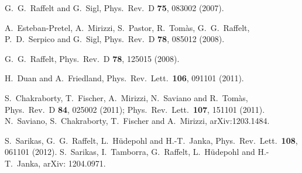 \documentclass[twocolumn,prd,showpacs,
floatfix,preprintnumbers,nofootinbib]{revtex4}
\begin{document}
\begin{thebibliography}{00}
  G.~G.~Raffelt and G.~Sigl,
  Phys.\ Rev.\  D {\bf 75}, 083002 (2007).

  A.~Esteban-Pretel, A.~Mirizzi, S.~Pastor, R.~Tom\`as,
  G.~G.~Raffelt, P.~D.~Serpico and G.~Sigl,
  Phys.\ Rev.\  D {\bf 78}, 085012 (2008).

  G.~G.~Raffelt,
  Phys.\ Rev.\ D {\bf 78}, 125015 (2008).

  H.~Duan and A.~Friedland,
  Phys.\ Rev.\ Lett.\  {\bf 106}, 091101 (2011).

  S.~Chakraborty, T.~Fischer, A.~Mirizzi, N.~Saviano and R.~Tom\`as,
  Phys.\ Rev.\  D {\bf 84}, 025002 (2011);
  Phys.\ Rev.\ Lett.\  {\bf 107}, 151101 (2011).
  N.~Saviano, S.~Chakraborty, T.~Fischer and A.~Mirizzi,
  arXiv:1203.1484.

  S.~Sarikas, G.~G.~Raffelt, L.~H\"udepohl and H.-T.~Janka,
  Phys.\ Rev.\ Lett.\  {\bf 108}, 061101 (2012).
  S.~Sarikas, I.~Tamborra, G.~Raffelt, L.~H\"udepohl and H.-T.~Janka,
  arXiv: 1204.0971.


\end{thebibliography}
\end{document}
